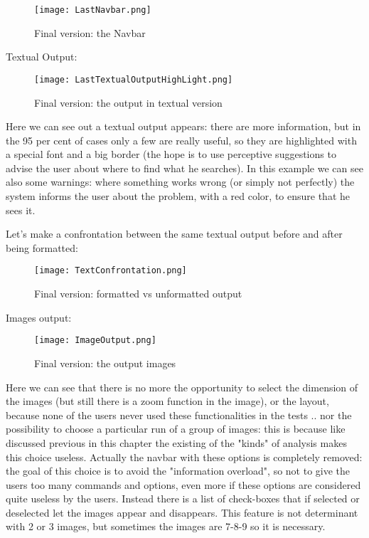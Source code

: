 \begin{figure}[H]
\centering
\texttt{[image: LastNavbar.png]} 
\caption{Final version: the Navbar}
\end{figure}  


Textual Output:

\begin{figure}[H]
\centering
\texttt{[image: LastTextualOutputHighLight.png]} 
\caption{Final version: the output in textual version}
\end{figure}  

Here we can see out a textual output appears: there are more information, but in the 95 per cent of cases only a few are really useful, so they are highlighted with a special font and a big border (the hope is to use perceptive suggestions to advise the user about where to find what he searches). In this example we can see also some warnings: where something works wrong (or simply not perfectly) the system informs the user about the problem, with a red color, to ensure that he sees it. 

Let's make a confrontation between the same textual output before and after being formatted:

\begin{figure}[H]
\centering
\texttt{[image: TextConfrontation.png]} 
\caption{Final version: formatted vs unformatted output}
\end{figure}  


Images output:

\begin{figure}[H]
\centering
\texttt{[image: ImageOutput.png]} 
\caption{Final version: the output images}
\end{figure}  

Here we can see that there is no more the opportunity to select the dimension of the images (but still there is a zoom function in the image), or the layout, because none of the users never used these functionalities in the tests .. nor the possibility to choose a particular run of a group of images: this is because like discussed previous in this chapter the existing of the "kinds" of analysis makes this choice useless. Actually the navbar with these options is completely removed: the goal of this choice is to avoid the "information overload", so not to give the users too many commands and options, even more if these options are considered quite useless by the users.
Instead there is a list of check-boxes that if selected or deselected let the images appear and disappears. This feature is not determinant with 2 or 3 images, but sometimes the images are 7-8-9 so it is necessary.

